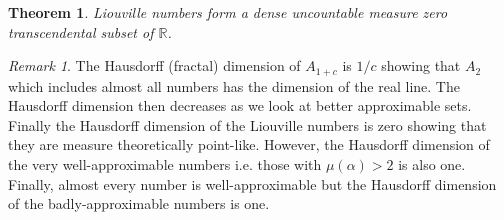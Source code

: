 \documentclass{article}
\newcommand{\R}{\mathbb{R}}
\theoremstyle{theorem}
\newtheorem{theorem}{Theorem}[section]
\theoremstyle{definition}
\theoremstyle{definition}
\theoremstyle{remark}
\theoremstyle{definition}
\theoremstyle{remark}
\newtheorem{remark}{Remark}[subsection]
\begin{document}
\begin{theorem}
Liouville numbers form a dense uncountable measure zero transcendental subset of $\R$. 
\end{theorem}

\begin{remark}
The Hausdorff (fractal) dimension of $A_{1 + c}$ is $1/c$ showing that $A_2$ which includes almost all numbers has the dimension of the real line. The Hausdorff dimension then decreases as we look at better approximable sets. Finally the Hausdorff dimension of the Liouville numbers is zero showing that they are measure theoretically point-like. However, the Hausdorff dimension of the very well-approximable numbers i.e. those with $\mu(\alpha) > 2$ is also one. Finally, almost every number is well-approximable but the Hausdorff dimension of the badly-approximable numbers is one.
\end{remark}
\end{document}
